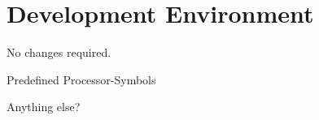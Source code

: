 
\chapter{Development Environment}

No changes required.

Predefined Processor-Symbols

Anything else?

